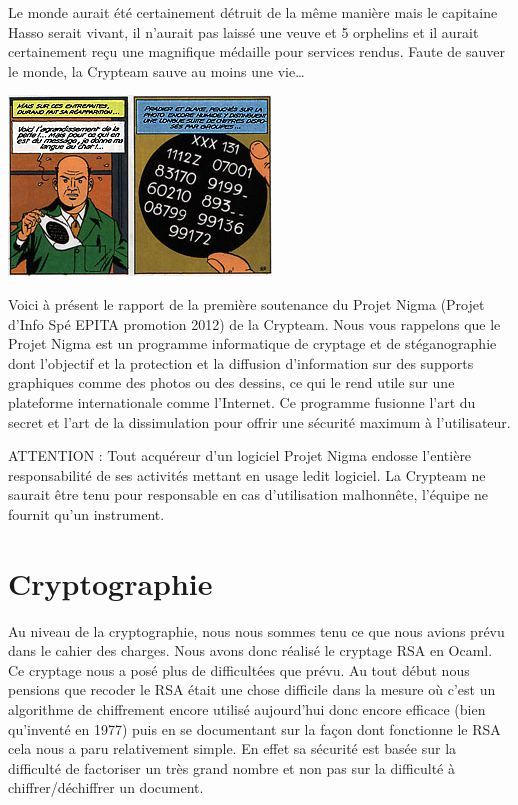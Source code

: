 \documentclass[a4paper,12pt]{article}
\begin{document}
Le monde aurait été certainement détruit de la même manière mais le capitaine Hasso serait vivant, il n'aurait pas laissé une veuve et 5 orphelins et il aurait certainement reçu une magnifique médaille pour services rendus. Faute de sauver le monde, la Crypteam sauve au moins une vie\dots{}

\begin{center}
  \includegraphics[scale=3]{meteores2.jpg}
\end{center}

Voici à présent le rapport de la première soutenance du Projet Nigma (Projet d'Info Spé EPITA promotion 2012) de la Crypteam. Nous vous rappelons que le Projet Nigma est un programme informatique de cryptage et de stéganographie dont l'objectif et la protection et la diffusion d'information sur des supports graphiques comme des photos ou des dessins, ce qui le rend utile sur une plateforme internationale comme l'Internet. Ce programme fusionne l'art du secret et l'art de la dissimulation pour offrir une sécurité maximum à l'utilisateur.

ATTENTION : Tout acquéreur d'un logiciel Projet Nigma endosse l'en\-tière responsabilité de ses activités mettant en usage ledit logiciel. La Crypteam ne saurait être tenu pour responsable en cas d'utilisation malhonnête, l'équipe ne fournit qu'un instrument.

\newpage

\section{Cryptographie}

Au niveau de la cryptographie, nous nous sommes tenu  ce que nous avions prévu dans le cahier des charges. Nous avons donc réalisé le cryptage RSA en Ocaml. Ce cryptage nous a posé plus de difficultées que prévu. Au tout début nous pensions que recoder le RSA était une chose difficile dans la mesure où c'est un algorithme de chiffrement encore utilisé aujourd'hui donc encore efficace (bien qu'inventé en 1977) puis en se documentant sur la façon dont fonctionne le RSA cela nous a paru relativement simple. En effet sa sécurité est basée sur la difficulté de factoriser un très grand nombre et non pas sur la difficulté à chiffrer/déchiffrer un document.
\end{document}

